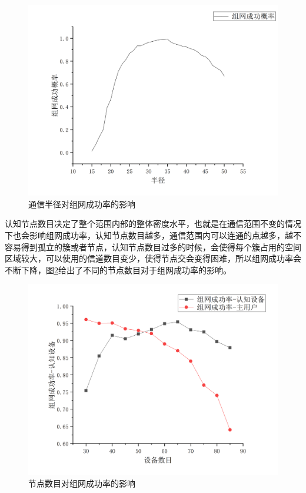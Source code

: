 \documentclass[a4paper,AutoFakeBold,oneside,12pt]{book}
\begin{document}
  \begin{figure}[htbp]
\centering %
\includegraphics[scale=0.3]{pictures/R-successp.png} 
\caption{通信半径对组网成功率的影响} %
\label{R-successp}
\end{figure}
  
  认知节点数目决定了整个范围内部的整体密度水平，也就是在通信范围不变的情况下也会影响组网成功率，认知节点数目越多，通信范围内可以连通的点越多，越不容易得到孤立的簇或者节点，认知节点数目过多的时候，会使得每个簇占用的空间区域较大，可以使用的信道数目变少，使得节点交会变得困难，所以组网成功率会不断下降，图\ref{CRPU-SUCCESS}给出了不同的节点数目对于组网成功率的影响。
    \begin{figure}[htbp]
\centering %
\includegraphics[scale=0.3]{pictures/CRPU-SUCCESS.png} 
\caption{节点数目对组网成功率的影响} %
\label{CRPU-SUCCESS}
\end{figure}
\end{document}
